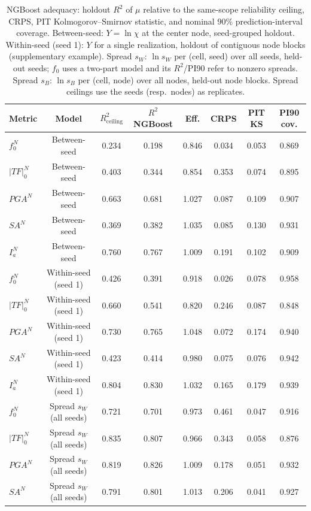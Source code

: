 \begin{table}[!ht]
\caption{NGBoost adequacy: holdout $R^2$ of $\mu$ relative to the same-scope reliability ceiling, CRPS, PIT Kolmogorov--Smirnov statistic, and nominal 90\% prediction-interval coverage. Between-seed: $Y=\ln\chi$ at the center node, seed-grouped holdout. Within-seed (seed 1): $Y$ for a single realization, holdout of contiguous node blocks (supplementary example). Spread $s_W$: $\ln s_W$ per (cell, seed) over all seeds, held-out seeds; $f_0$ uses a two-part model and its $R^2$/PI90 refer to nonzero spreads. Spread $s_B$: $\ln s_B$ per (cell, node) over all nodes, held-out node blocks. Spread ceilings use the seeds (resp.\ nodes) as replicates.\label{tab:model_adequacy}}
\begin{tabular*}{\textwidth}{@{\extracolsep{\fill}}lccccccc@{}}
\toprule
Metric & Model & $R^2_{\mathrm{ceiling}}$ & $R^2$ NGBoost & Eff. & CRPS & PIT KS & PI90 cov. \\
\midrule
$f_0^N$ & Between-seed & 0.234 & 0.198 & 0.846 & 0.034 & 0.053 & 0.869 \\
$\lvert TF\rvert_0^N$ & Between-seed & 0.403 & 0.344 & 0.854 & 0.353 & 0.074 & 0.895 \\
$PGA^N$ & Between-seed & 0.663 & 0.681 & 1.027 & 0.087 & 0.109 & 0.907 \\
$SA^N$ & Between-seed & 0.369 & 0.382 & 1.035 & 0.085 & 0.130 & 0.931 \\
$I_a^N$ & Between-seed & 0.760 & 0.767 & 1.009 & 0.191 & 0.102 & 0.909 \\
$f_0^N$ & Within-seed (seed 1) & 0.426 & 0.391 & 0.918 & 0.026 & 0.078 & 0.958 \\
$\lvert TF\rvert_0^N$ & Within-seed (seed 1) & 0.660 & 0.541 & 0.820 & 0.246 & 0.087 & 0.848 \\
$PGA^N$ & Within-seed (seed 1) & 0.730 & 0.765 & 1.048 & 0.072 & 0.174 & 0.940 \\
$SA^N$ & Within-seed (seed 1) & 0.423 & 0.414 & 0.980 & 0.075 & 0.076 & 0.942 \\
$I_a^N$ & Within-seed (seed 1) & 0.804 & 0.830 & 1.032 & 0.165 & 0.179 & 0.939 \\
$f_0^N$ & Spread $s_W$ (all seeds) & 0.721 & 0.701 & 0.973 & 0.461 & 0.047 & 0.916 \\
$\lvert TF\rvert_0^N$ & Spread $s_W$ (all seeds) & 0.835 & 0.807 & 0.966 & 0.343 & 0.058 & 0.876 \\
$PGA^N$ & Spread $s_W$ (all seeds) & 0.819 & 0.826 & 1.009 & 0.178 & 0.051 & 0.932 \\
$SA^N$ & Spread $s_W$ (all seeds) & 0.791 & 0.801 & 1.013 & 0.206 & 0.041 & 0.927 \\

\end{tabular*}
\end{table}
